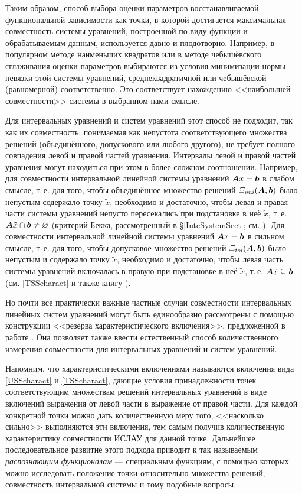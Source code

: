 \documentclass[a5paper,openany]{book}
\newcommand{\mbf}[1]{\protect\text{\boldmath$#1$}}
\newcommand{\Ab}{(\mbf{A}, \mbf{b})}
\newcommand{\USS}{\varXi_\mathit{\hspace{-0.5pt}uni}}
\newcommand{\TSS}{\varXi_\mathit{\hspace{-0.5pt}tol}}
\begin{document}
Таким образом, способ выбора оценки параметров восстанавливаемой функциональной 
зависимости как точки, в которой достигается максимальная совместность системы уравнений, 
построенной по виду функции и обрабатываемым данным, используется давно и плодотворно. 
Например, в популярном методе наименьших квадратов или в методе чебышёвского сглаживания 
оценки параметров выбираются из условия минимизации нормы невязки этой системы уравнений, 
среднеквадратичной или чебышёвской (равномерной) соответственно. Это соответствует 
нахождению <<наибольшей совместности>> системы в выбранном нами смысле. 
    
Для интервальных уравнений и систем уравнений этот способ не подходит, так как их 
совместность, понимаемая как непустота соответствующего множества решений (объединённого, 
допускового или любого другого), не требует полного совпадения левой и правой частей 
уравнения. Интервалы левой и правой частей уравнения могут находиться при этом в более 
сложном соотношении. Например, для совместности интервальной линейной системы уравнений 
$\mbf{A}x = \mbf{b}$ в слабом смысле, т.\,е. для того, чтобы объединённое множество 
решений $\USS\Ab$ было непустым содержало точку $\tilde{x}$, необходимо и достаточно, 
чтобы левая и правая части системы уравнений непусто пересекались при подстановке 
в неё $\tilde{x}$, т.\,е. $\mbf{A}\tilde{x}\cap\mbf{b}\neq\varnothing$ (критерий Бекка, 
рассмотренный в \S\ref{InteSystemSect}; см. \cite{SSharyBook}). Для совместности 
интервальной линейной системы уравнений $\mbf{A}x = \mbf{b}$ в сильном смысле, т.\,е. 
для того, чтобы допусковое множество решений $\TSS\Ab$ было непустым и содержало точку 
$\tilde{x}$, необходимо и достаточно, чтобы левая часть системы уравнений включалась 
в правую при подстановке в неё $\tilde{x}$, т.\,е. $\mbf{A}\tilde{x}\subseteq\mbf{b}$ 
(см. \eqref{TSScharact} и также книгу \cite{SSharyBook}). 
  
Но почти все практически важные частные случаи совместности интервальных линейных 
систем уравнений могут быть единообразно рассмотрены с помощью конструкции <<резерва 
характеристического включения>>, предложенной в работе \cite{SharysReserve}. Она позволяет 
также ввести естественный способ количественного измерения совместности для интервальных 
уравнений и систем уравнений. 
  
Напомним, что характеристическими включениями называются включения вида \eqref{USScharact} 
и \eqref{TSScharact}, дающие условия принадлежности 
точек соответствующим множествам решений интервальных уравнений в виде включений 
выражения от левой части в выражение от правой части. Для каждой конкретной точки можно 
дать количественную меру того, <<насколько сильно>> выполняются эти включения, тем самым 
получив количественную характеристику совместности ИСЛАУ для данной точке. Дальнейшее 
последовательное развитие этого подхода приводит к так называемым \emph{распознающим 
функционалам} --- специальным функциям, с помощью которых можно исследовать положение 
точки относительно множества решений, совместность интервальной системы и тому подобные 
вопросы. 
    
\end{document}
